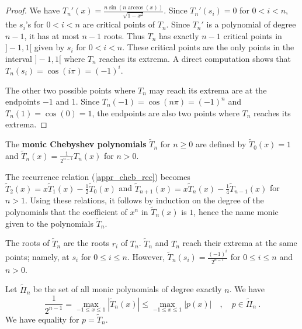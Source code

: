 \begin{proof}
We have $\displaystyle T_n'(x) = \frac{n\sin(n\arccos(x))}{\sqrt{1-x^2}}$.
Since $T_n'(s_i) = 0$ for $0<i<n$, the $s_i$'s for $0<i<n$ are critical
points of $T_n$.  Since $T_n'$ is a polynomial of degree $n-1$, it has at
most $n-1$ roots.  Thus $T_n$ has exactly $n-1$ critical points in $]-1,1[$
given by $s_i$ for $0<i<n$.  These critical points are the only points in the
interval $]-1,1[$ where $T_n$ reaches its extrema.  A direct computation
shows that $T_n(s_i) = \cos(i\pi) = (-1)^i$.

The other two possible points where $T_n$ may reach its extrema are at the
endpoints $-1$ and $1$.  Since $T_n(-1) = \cos(n\pi) = (-1)^n$ and
$T_n(1) = \cos(0) = 1$, the endpoints are also two points where $T_n$
reaches its extrema.
\end{proof}

\begin{defn}
The {\bfseries monic Chebyshev polynomials} $\tilde{T}_n$ for $n\geq 0$ are 
defined by $\displaystyle \tilde{T}_0(x) = 1$ and
$\displaystyle \tilde{T}_n(x) = \frac{1}{2^{n-1}} T_n(x)$ for $n >0$.
\end{defn}

\begin{rmk}
The recurrence relation (\ref{appr_cheb_rec}) becomes
$\displaystyle \tilde{T}_2(x) = x \tilde{T}_1(x) - \frac{1}{2} \tilde{T}_0(x)$
and
$\displaystyle \tilde{T}_{n+1}(x) = x \tilde{T}_n(x) - \frac{1}{4}
\tilde{T}_{n-1}(x)$ for $n>1$.  Using these relations, it follows by
induction on the degree of the polynomials that the coefficient of
$x^n$ in $\tilde{T}_n(x)$ is $1$, hence the name monic given to the
polynomials $\tilde{T}_n$.

The roots of $\tilde{T}_n$ are the roots $r_i$ of $T_n$.
$\tilde{T}_n$ and $T_n$ reach their extrema at the same points;
namely, at $s_i$ for $0\leq i \leq n$.  However,
$\displaystyle \tilde{T}_n(s_i) = \frac{(-1)^i}{2^{n-1}}$ for
$0\leq i \leq n$ and $n>0$.
\end{rmk}

\begin{prop}
Let $\tilde{\Pi}_n$ be the set of all monic polynomials of degree exactly
$n$.  We have
\[
\frac{1}{2^{n-1}} = \max_{-1\leq x \leq 1} \left| \tilde{T}_n(x)\right| \leq
\max_{-1\leq x \leq 1} \left| p(x) \right| \quad , \quad p \in \tilde{\Pi}_n
\ .
\]
We have equality for $p = \tilde{T}_n$.
\label{appr_nCheb_max}
\end{prop}


